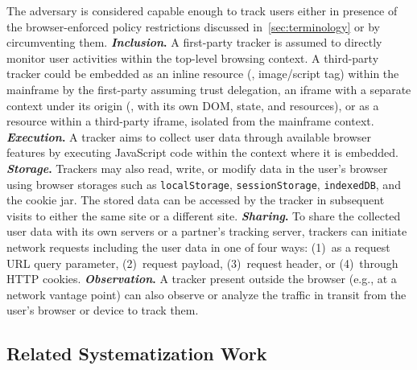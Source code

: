 %
%
%
The adversary is considered capable enough to track users either in presence of the browser-enforced policy restrictions discussed in~\autoref{sec:terminology} or by circumventing them.
%
\textbf{\textit{Inclusion}.} 
%
A first-party tracker is assumed to directly monitor user activities within the top-level browsing context.
%
A third-party tracker could be embedded as an inline resource (\eg{}, image/script tag) within the mainframe by the first-party assuming trust delegation, an iframe with a separate context under its origin (\ie{}, with its own DOM, state, and resources), or as a resource within a third-party iframe, isolated from the mainframe context. 
%
\textbf{\textit{Execution}.}
%
A tracker aims to collect user data through available browser features by executing JavaScript code within the context where it is embedded.
%
\textbf{\textit{Storage}.}
%
Trackers may also read, write, or modify data in the user's browser using browser storages such as \texttt{localStorage}, \texttt{sessionStorage}, \texttt{indexedDB}, and the cookie jar.
%
The stored data can be accessed by the tracker in subsequent visits to either the same site or a different site.
%
\textbf{\textit{Sharing}.}
%
To share the collected user data with its own servers or a partner's tracking server, trackers can initiate network requests including the user data in one of four ways: (1)~as a request URL query parameter, (2)~request payload, (3)~request header, or (4)~through HTTP cookies.
%
%
%
\textbf{\textit{Observation}.}
%
A tracker present outside the browser (e.g., at a network vantage point) can also observe or analyze the traffic in transit from the user's browser or device to track them. 





\subsection{Related Systematization Work}




